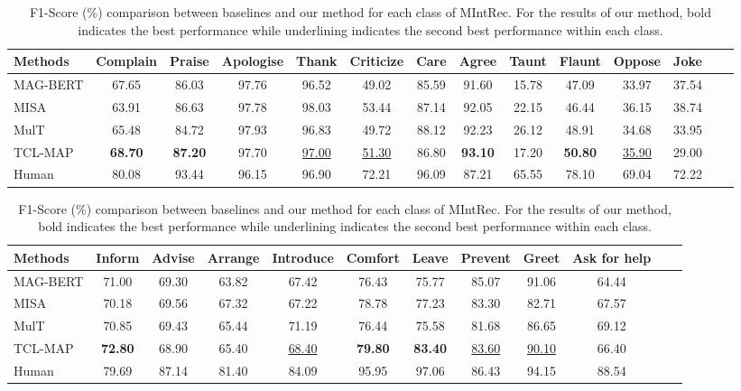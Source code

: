 \documentclass[letterpaper]{article} %
\begin{document}
\begin{table}[t!]
\renewcommand\tabcolsep{3pt}
\centering

 \begin{tabular*}{\textwidth}{c|c@{\extracolsep{\fill}}cccccccccccc}
 \toprule
\multicolumn{1}{l|}{Methods} &Complain& Praise & Apologise & Thank & Criticize  & Care & Agree & Taunt & Flaunt & Oppose & Joke   \\
\midrule
 \multicolumn{1}{l|}{MAG-BERT}  & 67.65 & 86.03 & 97.76 & 96.52 & 49.02 & 85.59 & 91.60 & 15.78 & 47.09 & 33.97 & 37.54 \\
  \multicolumn{1}{l|}{MISA}  & 63.91 & 86.63 & 97.78 & 98.03 & 53.44 & 87.14 & 92.05 & 22.15 & 46.44 & 36.15 & 38.74 \\
 \multicolumn{1}{l|}{MulT} & 65.48 & 84.72 & 97.93 & 96.83 & 49.72& 88.12 & 92.23 & 26.12 & 48.91 & 34.68 & 33.95 \\
  \multicolumn{1}{l|}{TCL-MAP}  & \textbf{68.70} & \textbf{87.20} & 97.70 & \underline{97.00} & \underline{51.30} & 86.80 & \textbf{93.10} & 17.20 & \textbf{50.80} & \underline{35.90} & 29.00 \\
  \midrule
 \multicolumn{1}{l|}{Human}  & 80.08 & 93.44 & 96.15 & 96.90 & 72.21 & 96.09 & 87.21 & 65.55 & 78.10 & 69.04 & 72.22 \\
 \midrule
\end{tabular*}


\begin{tabular*}{\textwidth}{c|c@{\extracolsep{\fill}}cccccccccc}
 \midrule
\multicolumn{1}{l|}{Methods} & Inform  &Advise & Arrange & Introduce & Comfort & Leave & Prevent & Greet & Ask for help\\
\midrule
 \multicolumn{1}{l|}{MAG-BERT}  & 71.00 & 69.30 & 63.82 & 67.42 & 76.43 & 75.77 & 85.07 & 91.06 & 64.44 \\
  \multicolumn{1}{l|}{MISA}  & 70.18 & 69.56 & 67.32 & 67.22 & 78.78 & 77.23 & 83.30 & 82.71 & 67.57 \\
 \multicolumn{1}{l|}{MulT} & 70.85  & 69.43 & 65.44 & 71.19 & 76.44 & 75.58 & 81.68 & 86.65 & 69.12  \\
\multicolumn{1}{l|}{TCL-MAP}  & \textbf{72.80} & 68.90 & 65.40 & \underline{68.40} & \textbf{79.80} & \textbf{83.40} & \underline{83.60} & \underline{90.10} & 66.40 \\
\midrule
 \multicolumn{1}{l|}{Human}  & 79.69 & 87.14 & 81.40 & 84.09 & 95.95 & 97.06 & 86.43 & 94.15 & 88.54 \\
\bottomrule
 \end{tabular*}

\caption{\protect \label{results_each_classes} F1-Score (\%) comparison between baselines and our method for each class of MIntRec. For the results of our method, bold indicates the best performance while underlining indicates the second best performance within each class.
}
\end{table}
\end{document}
